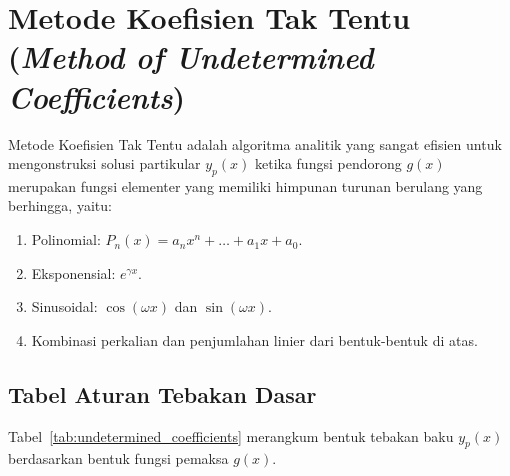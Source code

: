 \documentclass[11pt,a4paper]{article}
\theoremstyle{definition}
\begin{document}
\section{Metode Koefisien Tak Tentu (\textit{Method of Undetermined Coefficients})}

Metode Koefisien Tak Tentu adalah algoritma analitik yang sangat efisien untuk mengonstruksi solusi partikular $y_p(x)$ ketika fungsi pendorong $g(x)$ merupakan fungsi elementer yang memiliki himpunan turunan berulang yang berhingga, yaitu:
\begin{enumerate}[leftmargin=*]
    \item Polinomial: $P_n(x) = a_n x^n + \dots + a_1 x + a_0$.
    \item Eksponensial: $e^{\gamma x}$.
    \item Sinusoidal: $\cos(\omega x)$ dan $\sin(\omega x)$.
    \item Kombinasi perkalian dan penjumlahan linier dari bentuk-bentuk di atas.
\end{enumerate}

\subsection{Tabel Aturan Tebakan Dasar}

Tabel~\ref{tab:undetermined_coefficients} merangkum bentuk tebakan baku $y_p(x)$ berdasarkan bentuk fungsi pemaksa $g(x)$.

\begin{table}[htbp]
\centering
\caption{Bentuk Tebakan Standar Metode Koefisien Tak Tentu.}
\label{tab:undetermined_coefficients}
\end{table}
\end{document}

